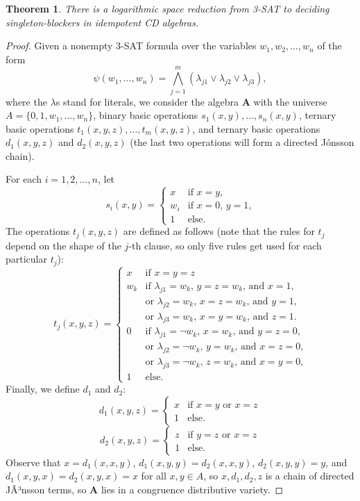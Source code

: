 \documentclass{amsart}
\theoremstyle{plain}
\newtheorem{theorem}{Theorem}
\theoremstyle{definition}
\begin{document}
\begin{theorem}\label{thmReduction}
  There is a logarithmic space reduction from 3-SAT to deciding
  singleton-blockers in idempotent CD algebras.
\end{theorem}
  \begin{proof}
    Given a nonempty 3-SAT formula over the
    variables $w_1,w_2,\dots,w_n$ of the form
    \[
      \psi(w_1,\dots,w_n)=\bigwedge_{j=1}^m (\lambda_{j1}\vee \lambda_{j2}\vee
  \lambda_{j3}),
  \]
  where the $\lambda$s stand for literals, we consider the algebra ${{\mathbf{A}}}$ with
  the universe $A=\{0,1,w_1,\dots,w_n\}$, binary basic operations
  $s_1(x,y),\dots,s_n(x,y)$, ternary basic operations
  $t_1(x,y,z),\dots,t_m(x,y,z)$, and ternary basic operations 
  $d_1(x,y,z)$ and $d_2(x,y,z)$ (the last two operations will form a directed J\'onsson chain). 
  
  For
  each $i=1,2,\dots,n$, let
  \[
    s_i(x,y)=\begin{cases}
       x& \text{if $x=y$,} \\
       w_i& \text{if $x=0$, $y=1$,}\\
       1& \text{else.}
    \end{cases}
  \]
  The operations $t_j(x,y,z)$ are defined as follows (note that the rules for $t_j$ depend
  on the shape of the $j$-th clause, so only five rules get used for each particular $t_j$):
  \[
    t_j(x,y,z)=
    \begin{cases}
      x&\text{if $x=y=z$}\\
      w_k&\text{if $\lambda_{j1}=w_k$, $y=z=w_k$, and $x=1$,}\\
       &\text{or $\lambda_{j2}=w_k$, $x=z=w_k$, and $y=1$,}\\
      &\text{or $\lambda_{j3}=w_k$, $x=y=w_k$, and $z=1$.}\\
      0&\text{if $\lambda_{j1}=\neg w_k$, $x=w_k$, and $y=z=0$,}\\
      &\text{or $\lambda_{j2}=\neg w_k$, $y=w_k$, and $x=z=0$,}\\
      &\text{or $\lambda_{j3}=\neg w_k$, $z=w_k$, and $x=y=0$,}\\
      1&\text{else.}
    \end{cases}
  \]
Finally, we define $d_1$ and $d_2$:
 \[
      d_1(x,y,z)=
      \begin{cases}
	x& \text{if $x=y$ or $x=z$}\\
	1& \text{else.}
      \end{cases}
    \]
    \[
      d_2(x,y,z)=
      \begin{cases}
	z& \text{if $y=z$ or $x=z$}\\
	1& \text{else.}
      \end{cases}
    \]
    Observe that $x=d_1(x,x,y)$, $d_1(x,y,y)=d_2(x,x,y)$, $d_2(x,y,y)=y$, and
    $d_1(x,y,x)=d_2(x,y,x)=x$ for all $x,y\in A$, so $x,d_1,d_2,z$ is a chain of directed JÃ³nsson
    terms, so ${{\mathbf{A}}}$ lies in a congruence distributive variety.


\end{proof}
\end{document}
